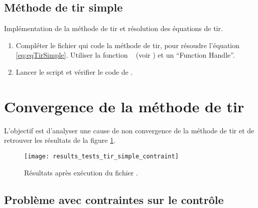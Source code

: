 
\subsection{M\'ethode de tir simple}

\begin{myExercice} Impl\'ementation de la m\'ethode de tir et r\'esolution des \'equations de tir.
\begin{enumerate}
    \item Compl\'eter le fichier  qui code la m\'ethode de tir, pour r\'esoudre l'\'equation \eqref{eq:eqTirSimple}.
        Utiliser la fonction \matlab\  (voir ) et un ``Function Handle''.
    \item Lancer le script  et v\'erifier le code de .
\end{enumerate}
\end{myExercice}

\section{Convergence de la m\'ethode de tir}

L'objectif est d'analyser une cause de non convergence de la m\'ethode de tir et de retrouver les r\'esultats de la
figure \ref{fig:results_tests_tir_simple_contraint}.

\begin{figure}[ht!]
    \begin{center}
        \texttt{[image: results\_tests\_tir\_simple\_contraint]}
    \end{center}
    \caption{R\'esultats apr\`es ex\'ecution du fichier .}
    \label{fig:results_tests_tir_simple_contraint}
\end{figure}

\subsection{Probl\`eme avec contraintes sur le contr\^ole}

